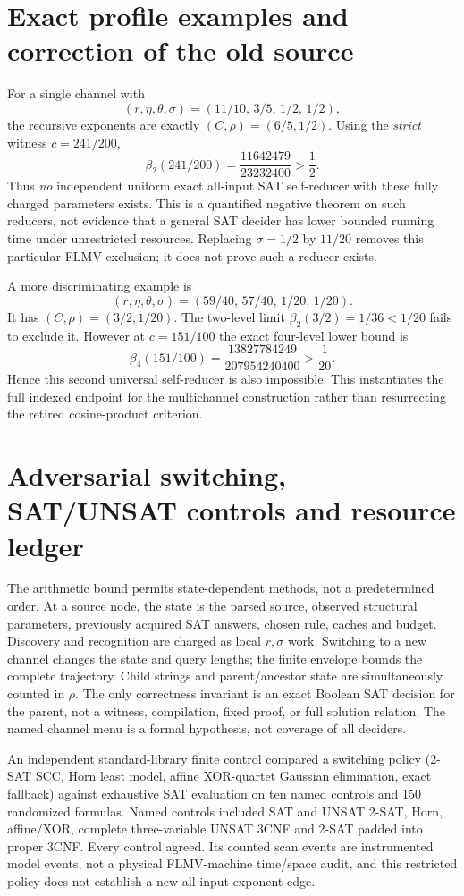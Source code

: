 \documentclass[11pt]{article}
\begin{document}
\section{Exact profile examples and correction of the old source}
For a single channel with
\[
 (r,\eta,\theta,\sigma)=
 (11/10,\,3/5,\,1/2,\,1/2),
\]
the recursive exponents are exactly $(C,\rho)=(6/5,1/2)$. Using the \emph{strict} witness $c=241/200$,
\[
 \beta_2(241/200)=\frac{11642479}{23232400}>\frac12.
\]
Thus \emph{no} independent uniform exact all-input SAT self-reducer with these fully charged parameters exists. This is a quantified negative theorem on such reducers, not evidence that a general SAT decider has lower bounded running time under unrestricted resources. Replacing $\sigma=1/2$ by $11/20$ removes this particular FLMV exclusion; it does not prove such a reducer exists.

A more discriminating example is
\[
 (r,\eta,\theta,\sigma)=
 (59/40,\,57/40,\,1/20,\,1/20).
\]
It has $(C,\rho)=(3/2,1/20)$. The two-level limit $\beta_2(3/2)=1/36<1/20$ fails to exclude it. However at $c=151/100$ the exact four-level lower bound is
\[
 \beta_4(151/100)=
 \frac{13827784249}{207954240400}>\frac1{20}.
\]
Hence this second universal self-reducer is also impossible. This instantiates the full indexed endpoint for the multichannel construction rather than resurrecting the retired cosine-product criterion.

\section{Adversarial switching, SAT/UNSAT controls and resource ledger}
The arithmetic bound permits state-dependent methods, not a predetermined order. At a source node, the state is the parsed source, observed structural parameters, previously acquired SAT answers, chosen rule, caches and budget. Discovery and recognition are charged as local $r,\sigma$ work. Switching to a new channel changes the state and query lengths; the finite envelope bounds the complete trajectory. Child strings and parent/ancestor state are simultaneously counted in $\rho$. The only correctness invariant is an exact Boolean SAT decision for the parent, not a witness, compilation, fixed proof, or full solution relation. The named channel menu is a formal hypothesis, not coverage of all deciders.

An independent standard-library finite control compared a switching policy (2-SAT SCC, Horn least model, affine XOR-quartet Gaussian elimination, exact fallback) against exhaustive SAT evaluation on ten named controls and 150 randomized formulas. Named controls included SAT and UNSAT 2-SAT, Horn, affine/XOR, complete three-variable UNSAT 3CNF and 2-SAT padded into proper 3CNF. Every control agreed. Its counted scan events are instrumented model events, not a physical FLMV-machine time/space audit, and this restricted policy does not establish a new all-input exponent edge.
\end{document}
